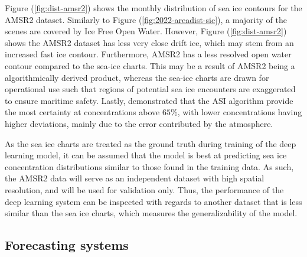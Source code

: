 \documentclass[../main/thesis.tex]{subfiles}
\begin{document}
Figure (\ref{fig:dist-amsr2}) shows the monthly distribution of sea ice contours for the AMSR2 dataset. Similarly to Figure (\ref{fig:2022-areadist-sic}), a majority of the scenes are covered by Ice Free Open Water. However, Figure (\ref{fig:dist-amsr2}) shows the AMSR2 dataset has less very close drift ice, which may stem from an increased fast ice contour. Furthermore, AMSR2 has a less resolved open water contour compared to the sea-ice charts. This may be a result of AMSR2 being a algorithmically derived product, whereas the sea-ice charts are drawn for operational use such that regions of potential sea ice encounters are exaggerated to ensure maritime safety. Lastly, \citet{Spreen2008} demonstrated that the ASI algorithm provide the most certainty at concentrations above $65\%$, with lower concentrations having higher deviations, mainly due to the error contributed by the atmosphere.

As the sea ice charts are treated as the ground truth during training of the deep learning model, it can be assumed that the model is best at predicting sea ice concentration distributions similar to those found in the training data. As such, the AMSR2 data will serve as an independent dataset with high spatial resolution, and will be used for validation only. Thus, the performance of the deep learning system can be inspected with regards to another dataset that is less similar than the sea ice charts, which measures the generalizability of the model.

\subsection{Forecasting systems} 
\end{document}
